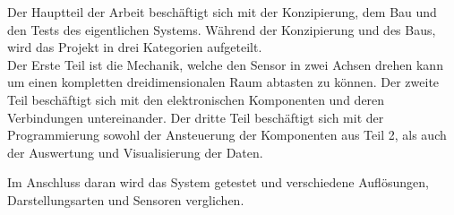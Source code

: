 Der Hauptteil der Arbeit beschäftigt sich mit der Konzipierung, dem Bau und den Tests des eigentlichen Systems. Während der Konzipierung und des Baus, wird das Projekt in drei Kategorien aufgeteilt.\\
Der Erste Teil ist die Mechanik, welche den Sensor in zwei Achsen drehen kann um einen kompletten dreidimensionalen Raum abtasten zu können. Der zweite Teil beschäftigt sich mit den elektronischen Komponenten und deren Verbindungen untereinander. Der dritte Teil beschäftigt sich mit der Programmierung sowohl der Ansteuerung der Komponenten aus Teil 2, als auch der Auswertung und Visualisierung der Daten.

Im Anschluss daran wird das System getestet und verschiedene Auflösungen, Darstellungsarten und Sensoren verglichen.

